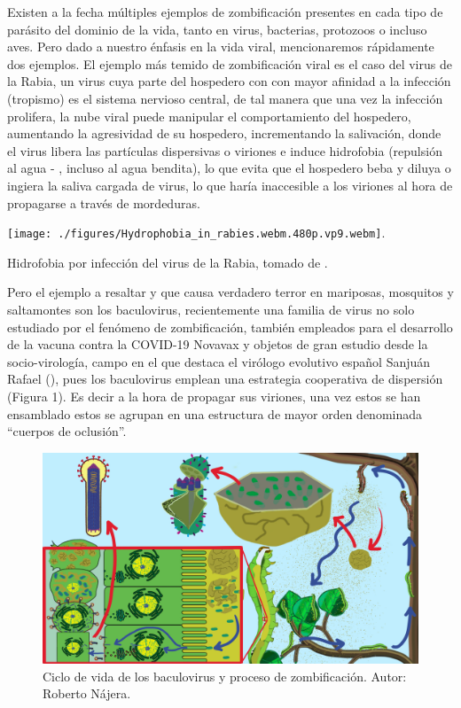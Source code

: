 \documentclass[
  12pt, krantz2,
  spanish,
]{krantz}
\begin{document}
Existen a la fecha múltiples ejemplos de zombificación presentes en cada tipo de parásito del dominio de la vida, tanto en virus, bacterias, protozoos o incluso aves. Pero dado a nuestro énfasis en la vida viral, mencionaremos rápidamente dos ejemplos. El ejemplo más temido de zombificación viral es el caso del virus de la Rabia, un virus cuya parte del hospedero con con mayor afinidad a la infección (tropismo) es el sistema nervioso central, de tal manera que una vez la infección prolifera, la nube viral puede manipular el comportamiento del hospedero, aumentando la agresividad de su hospedero, incrementando la salivación, donde el virus libera las partículas dispersivas o viriones e induce hidrofobia (repulsión al agua - \citet{wertheim2009furious}, incluso al agua bendita), lo que evita que el hospedero beba y diluya o ingiera la saliva cargada de virus, lo que haría inaccesible a los viriones al hora de propagarse a través de mordeduras.

\texttt{[image: ./figures/Hydrophobia\_in\_rabies.webm.480p.vp9.webm]}.

Hidrofobia por infección del virus de la Rabia, tomado de \citet{wertheim2009furious}.

Pero el ejemplo a resaltar y que causa verdadero terror en mariposas, mosquitos y saltamontes son los baculovirus, recientemente una familia de virus no solo estudiado por el fenómeno de zombificación, también empleados para el desarrollo de la vacuna contra la COVID-19 Novavax y objetos de gran estudio desde la socio-virología, campo en el que destaca el virólogo evolutivo español Sanjuán Rafael (\citet{sanjuan2021social}), pues los baculovirus emplean una estrategia cooperativa de dispersión (Figura 1). Es decir a la hora de propagar sus viriones, una vez estos se han ensamblado estos se agrupan en una estructura de mayor orden denominada ``cuerpos de oclusión''.

\begin{figure}
\includegraphics[width=0.8\linewidth]{figures/baculovirus_final} \caption{Ciclo de vida de los baculovirus y proceso de zombificación. Autor: Roberto Nájera.}\label{fig:zombificacion}
\end{figure}
\end{document}
